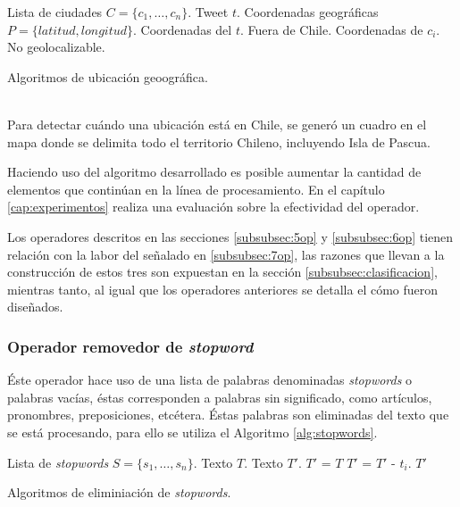 \begin{algorithm}[H]
	\begin{algorithmic}
		\REQUIRE Lista de ciudades $C=\{c_{1}, \dots, c_{n} \}$.
		\REQUIRE Tweet $t$.
		\ENSURE Coordenadas geográficas $P=\{latitud, longitud\}$.
				\RETURN Coordenadas del $t$.
			\ELSE
				\RETURN Fuera de Chile.
			\ENDIF
		\ELSE
				\RETURN Coordenadas de $c_{i}$.
			\ELSE
				\RETURN No geolocalizable.
			\ENDIF
		\ENDIF
	\end{algorithmic}
	\caption{Algoritmos de ubicación geoográfica.}
	\label{alg:geolocalizacion}
\end{algorithm}\vphantom\\

Para detectar cuándo una ubicación está en Chile, se generó un cuadro en el mapa donde se delimita todo el territorio Chileno, incluyendo Isla de Pascua.

Haciendo uso del algoritmo desarrollado es posible aumentar la cantidad de elementos que continúan en la línea de procesamiento. En el capítulo \ref{cap:experimentos} realiza una evaluación sobre la efectividad del operador.

Los operadores descritos en las secciones \ref{subsubsec:5op} y \ref{subsubsec:6op} tienen relación con la labor del señalado en \ref{subsubsec:7op}, las razones que llevan a la construcción de estos tres son expuestan en la sección \ref{subsubsec:clasificacion}, mientras tanto, al igual que los operadores anteriores se detalla el cómo fueron diseñados.

\subsubsection*{Operador removedor de \textit{stopword}}
\label{subsubsec:5op}

Éste operador hace uso de una lista de palabras denominadas \textit{stopwords} o palabras vacías, éstas corresponden a palabras sin significado, como artículos, pronombres, preposiciones, etcétera. Éstas palabras son eliminadas del texto que se está procesando, para ello se utiliza el Algoritmo \ref{alg:stopwords}.\\

\begin{algorithm}[H]
	\begin{algorithmic}
		\REQUIRE Lista de \textit{stopwords} $S=\{s_{1}, \dots, s_{n} \}$.
		\REQUIRE Texto $T$.
		\ENSURE Texto $T'$.
		\STATE $T'$ = $T$
			\STATE $T'$ = $T'$ - $t_{i}$. 
			\ENDIF
		\ENDFOR
		\RETURN $T'$
	\end{algorithmic}
	\caption{Algoritmos de eliminiación de \textit{stopwords}.}
	\label{alg:stopwords}
\end{algorithm}\vphantom\\

